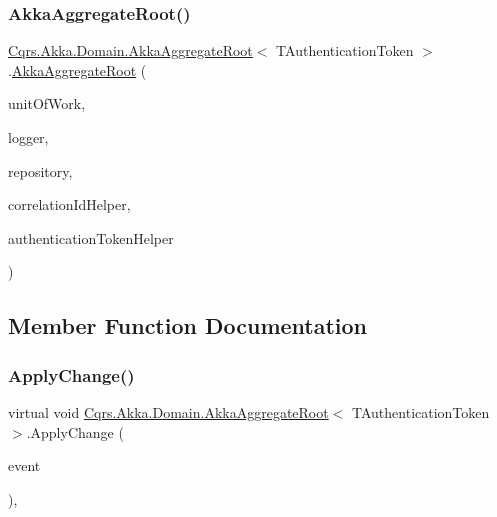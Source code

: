 \subsubsection{\texorpdfstring{Akka\+Aggregate\+Root()}{AkkaAggregateRoot()}}
{\footnotesize\ttfamily \hyperlink{classCqrs_1_1Akka_1_1Domain_1_1AkkaAggregateRoot}{Cqrs.\+Akka.\+Domain.\+Akka\+Aggregate\+Root}$<$ T\+Authentication\+Token $>$.\hyperlink{classCqrs_1_1Akka_1_1Domain_1_1AkkaAggregateRoot}{Akka\+Aggregate\+Root} (\begin{DoxyParamCaption}\item[{\hyperlink{interfaceCqrs_1_1Domain_1_1IUnitOfWork}{I\+Unit\+Of\+Work}$<$ T\+Authentication\+Token $>$}]{unit\+Of\+Work,  }\item[{I\+Logger}]{logger,  }\item[{\hyperlink{interfaceCqrs_1_1Akka_1_1Domain_1_1IAkkaAggregateRepository}{I\+Akka\+Aggregate\+Repository}$<$ T\+Authentication\+Token $>$}]{repository,  }\item[{I\+Correlation\+Id\+Helper}]{correlation\+Id\+Helper,  }\item[{\hyperlink{interfaceCqrs_1_1Authentication_1_1IAuthenticationTokenHelper}{I\+Authentication\+Token\+Helper}$<$ T\+Authentication\+Token $>$}]{authentication\+Token\+Helper }\end{DoxyParamCaption})\hspace{0.3cm}{\ttfamily [protected]}}



\subsection{Member Function Documentation}
\mbox{\label{classCqrs_1_1Akka_1_1Domain_1_1AkkaAggregateRoot_aaa135cb26be9e5353986f5611f05c059}} 
\subsubsection{\texorpdfstring{Apply\+Change()}{ApplyChange()}}
{\footnotesize\ttfamily virtual void \hyperlink{classCqrs_1_1Akka_1_1Domain_1_1AkkaAggregateRoot}{Cqrs.\+Akka.\+Domain.\+Akka\+Aggregate\+Root}$<$ T\+Authentication\+Token $>$.Apply\+Change (\begin{DoxyParamCaption}\item[{\hyperlink{interfaceCqrs_1_1Events_1_1IEvent}{I\+Event}$<$ T\+Authentication\+Token $>$ @}]{event }\end{DoxyParamCaption})\hspace{0.3cm}{\ttfamily [protected]}, {\ttfamily [virtual]}}

